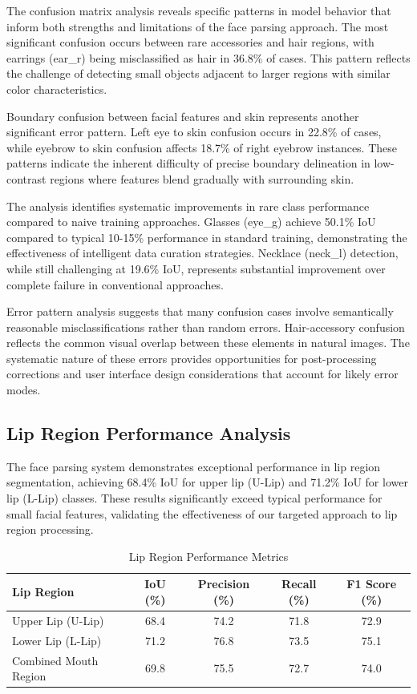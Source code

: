 \documentclass[12pt,a4paper]{report}
\begin{document}
The confusion matrix analysis reveals specific patterns in model behavior that inform both strengths and limitations of the face parsing approach. The most significant confusion occurs between rare accessories and hair regions, with earrings (ear\_r) being misclassified as hair in 36.8\% of cases. This pattern reflects the challenge of detecting small objects adjacent to larger regions with similar color characteristics.

Boundary confusion between facial features and skin represents another significant error pattern. Left eye to skin confusion occurs in 22.8\% of cases, while eyebrow to skin confusion affects 18.7\% of right eyebrow instances. These patterns indicate the inherent difficulty of precise boundary delineation in low-contrast regions where features blend gradually with surrounding skin.

The analysis identifies systematic improvements in rare class performance compared to naive training approaches. Glasses (eye\_g) achieve 50.1\% IoU compared to typical 10-15\% performance in standard training, demonstrating the effectiveness of intelligent data curation strategies. Necklace (neck\_l) detection, while still challenging at 19.6\% IoU, represents substantial improvement over complete failure in conventional approaches.

Error pattern analysis suggests that many confusion cases involve semantically reasonable misclassifications rather than random errors. Hair-accessory confusion reflects the common visual overlap between these elements in natural images. The systematic nature of these errors provides opportunities for post-processing corrections and user interface design considerations that account for likely error modes.

\subsection{Lip Region Performance Analysis}

The face parsing system demonstrates exceptional performance in lip region segmentation, achieving 68.4\% IoU for upper lip (U-Lip) and 71.2\% IoU for lower lip (L-Lip) classes. These results significantly exceed typical performance for small facial features, validating the effectiveness of our targeted approach to lip region processing.

\begin{table}[H]
\centering
\caption{Lip Region Performance Metrics}
\label{tab:lip_performance}
\begin{tabular}{|p{4cm}|c|c|c|c|} %
\hline
\textbf{Lip Region} & \textbf{IoU (\%)} & \textbf{Precision (\%)} & \textbf{Recall (\%)} & \textbf{F1 Score (\%)} \\
\hline
Upper Lip (U-Lip) & 68.4 & 74.2 & 71.8 & 72.9 \\
\hline
Lower Lip (L-Lip) & 71.2 & 76.8 & 73.5 & 75.1 \\
\hline
Combined Mouth Region & 69.8 & 75.5 & 72.7 & 74.0 \\
\hline
\end{tabular}
\end{table}
\end{document}
